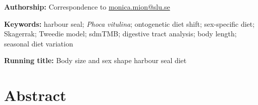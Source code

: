 \author[1,*]{Monica Mion}
\author[1]{Max Lindmark}
\author[1]{Karl Lundstr{\"o}m}
\author[2]{Karin H{\aa}rding}



\begin{spacing}{2}
\maketitle

\vspace*{\fill}
\noindent
\textbf{Authorship:} Correspondence to \href{mailto:monica.mion@slu.se}{monica.mion@slu.se}

\noindent
\textbf{Keywords:} harbour seal; \textit{Phoca vitulina}; ontogenetic diet shift; sex-specific diet; Skagerrak; Tweedie model; sdmTMB; digestive tract analysis; body length; seasonal diet variation

\noindent
\textbf{Running title:} Body size and sex shape harbour seal diet

\clearpage
\linenumbers
\setcounter{secnumdepth}{0}

\section{Abstract}


\end{spacing}
